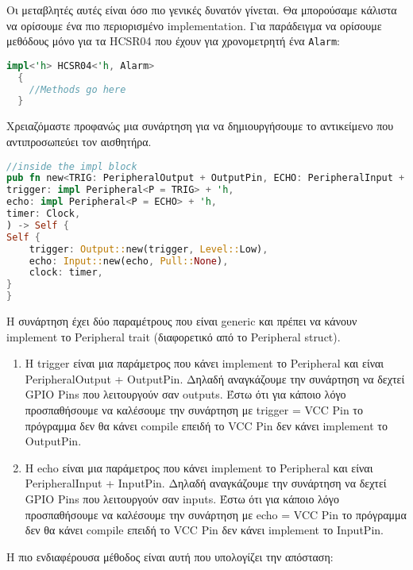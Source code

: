 Οι μεταβλητές αυτές είναι όσο πιο γενικές δυνατόν γίνεται. Θα μπορούσαμε
κάλιστα να ορίσουμε ένα πιο περιορισμένο implementation. Για παράδειγμα να
ορίσουμε μεθόδους μόνο για τα HCSR04 που έχουν για χρονομετρητή ένα \verb|Alarm|:

\begin{lstlisting}[language=Rust]
  impl<'h> HCSR04<'h, Alarm>
  {
    //Methods go here
  }
\end{lstlisting}

Χρειαζόμαστε προφανώς μια συνάρτηση για να δημιουργήσουμε
το αντικείμενο που αντιπροσωπεύει τον αισθητήρα.

\begin{lstlisting}[language=Rust]
//inside the impl block
pub fn new<TRIG: PeripheralOutput + OutputPin, ECHO: PeripheralInput + InputPin>(
trigger: impl Peripheral<P = TRIG> + 'h,
echo: impl Peripheral<P = ECHO> + 'h,
timer: Clock,
) -> Self {
Self {
    trigger: Output::new(trigger, Level::Low),
    echo: Input::new(echo, Pull::None),
    clock: timer,
}
}
\end{lstlisting}

Η συνάρτηση έχει δύο παραμέτρους που είναι generic και πρέπει
να κάνουν implement το Peripheral trait (διαφορετικό από το Peripheral struct).

\begin{enumerate}
\item Η trigger είναι μια παράμετρος που κάνει implement το Peripheral
  και είναι PeripheralOutput + OutputPin. Δηλαδή αναγκάζουμε την συνάρτηση
  να δεχτεί GPIO Pins που λειτουργούν σαν outputs. Έστω ότι για κάποιο
  λόγο προσπαθήσουμε να καλέσουμε την συνάρτηση με trigger = VCC Pin
  το πρόγραμμα δεν θα κάνει compile επειδή το VCC Pin δεν κάνει implement
  το OutputPin.
\item Η echo είναι μια παράμετρος που κάνει implement το Peripheral
  και είναι PeripheralInput + InputPin. Δηλαδή αναγκάζουμε την συνάρτηση
  να δεχτεί GPIO Pins που λειτουργούν σαν inputs. Έστω ότι για κάποιο
  λόγο προσπαθήσουμε να καλέσουμε την συνάρτηση με echo = VCC Pin
  το πρόγραμμα δεν θα κάνει compile επειδή το VCC Pin δεν κάνει implement
  το InputPin.
\end{enumerate}

Η πιο ενδιαφέρουσα μέθοδος είναι αυτή που υπολογίζει την απόσταση:

